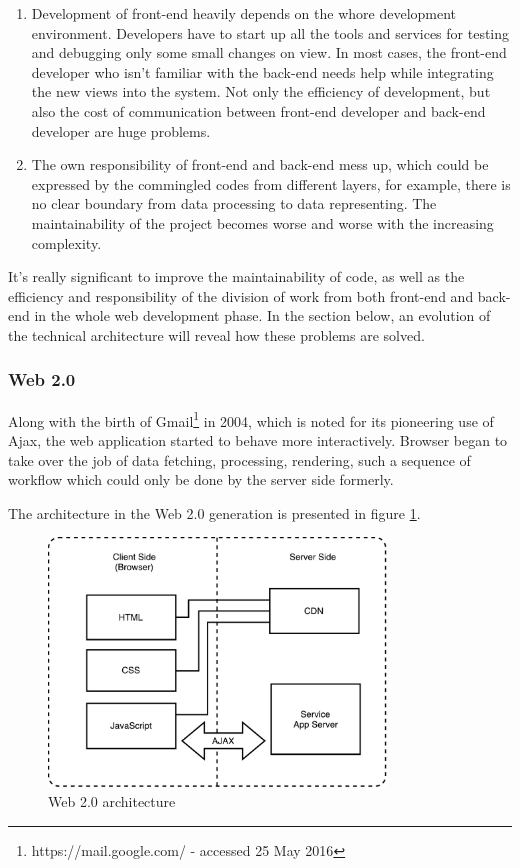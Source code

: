 \begin{enumerate}
\item
Development of front-end heavily depends on the whore development environment. Developers have to start up all the tools and services for testing and debugging only some small changes on view. In most cases, the front-end developer who isn't familiar with the back-end needs help while integrating the new views into the system. Not only the efficiency of development, but also the cost of communication between front-end developer and back-end developer are huge problems.
\item
The own responsibility of front-end and back-end mess up, which could be expressed by the commingled codes from different layers, for example, there is no clear boundary from data processing to data representing. The maintainability of the project becomes worse and worse with the increasing complexity.
\end{enumerate}

It's really significant to improve the maintainability of code, as well as the efficiency and responsibility of the division of work from both front-end and back-end in the whole web development phase. In the section below, an evolution of the technical architecture will reveal how these problems are solved.

\subsubsection{Web 2.0}
Along with the birth of Gmail\footnote{https://mail.google.com/ - accessed 25 May 2016} in 2004, which is noted for its pioneering use of \gls{Ajax}, the web application started to behave more interactively. Browser began to take over the job of data fetching, processing, rendering, such a sequence of workflow which could only be done by the server side formerly.

The architecture in the Web 2.0 generation is presented in figure \ref{fig:3.2}.

\begin{figure}[!htbp]
  \centering
    \includegraphics[width=0.8\textwidth]{Figures/tech-web-arch-2.pdf}
  \caption{Web 2.0 architecture}
  \label{fig:3.2}
\end{figure}

